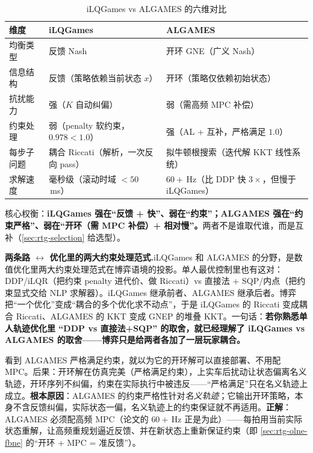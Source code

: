 \begin{table}[H]\centering\small
\caption{iLQGames vs ALGAMES 的六维对比}
\label{tab:rtg-ilq-vs-alg}
\begin{tabular}{p{} p{} p{}}
\toprule
维度 & iLQGames & ALGAMES \\
\midrule
均衡类型 & 反馈 Nash & 开环 GNE（广义 Nash） \\
信息结构 & 反馈（策略依赖当前状态 $x$） & 开环（策略仅依赖初始状态） \\
抗扰能力 & 强（$K$ 自动纠偏） & 弱（需高频 MPC 补偿） \\
约束处理 & 弱（penalty 软约束，$0.978<1.0$） & 强（AL + 互补，严格满足 $1.0$） \\
每步子问题 & 耦合 Riccati（解析，一次反向 pass） & 拟牛顿根搜索（迭代解 KKT 线性系统） \\
求解速度 & 毫秒级（滚动时域 $<50$\,ms） & $60+$\,Hz（比 DDP 快 $3\times$，但慢于 iLQGames） \\
\bottomrule
\end{tabular}
\end{table}

\noindent 核心权衡：\textbf{iLQGames 强在“反馈 + 快”、弱在“约束”；ALGAMES 强在“约束严格”、弱在“开环（需 MPC 补偿）+ 相对慢”。}两者不是谁取代谁，而是互补（\cref{sec:rtg-selection} 给选型）。

\begin{insight}
\textbf{两条路 $\leftrightarrow$ 优化里的两大约束处理范式.}\;iLQGames 和 ALGAMES 的分野，是数值优化里两大约束处理范式在博弈语境的投影。单人最优控制里也有这对：DDP/iLQR（把约束 penalty 进代价、做 Riccati）vs 直接法 + SQP/内点（把约束显式交给 NLP 求解器）。iLQGames 继承前者、ALGAMES 继承后者。博弈把“一个优化”变成“耦合的多个优化求不动点”，于是 iLQGames 的 Riccati 变成耦合 Riccati、ALGAMES 的 KKT 变成 GNEP 的堆叠 KKT。一句话：\textbf{若你熟悉单人轨迹优化里 “DDP vs 直接法+SQP” 的取舍，就已经理解了 iLQGames vs ALGAMES 的取舍——博弈只是给两者各加了一层玩家耦合。}
\end{insight}

\begin{pitfall}
看到 ALGAMES 严格满足约束，就以为它的开环解可以直接部署、不用配 MPC。后果：开环解在仿真完美（严格满足约束），上实车后扰动让状态偏离名义轨迹，开环序列不纠偏，约束在实际执行中被违反——“严格满足”只在名义轨迹上成立。\textbf{根本原因}：ALGAMES 的约束严格性针对\emph{名义轨迹}；它输出开环策略，本身不含反馈纠偏，实际状态一偏，名义轨迹上的约束保证就不再适用。\textbf{正解}：ALGAMES 必须配高频 MPC（论文的 $60+$\,Hz 正是为此）——每拍用当前实际状态重解，让高频重规划逼近反馈、并在新状态上重新保证约束（即 \cref{sec:rtg-olne-fbne} 的“开环 + MPC = 准反馈”）。
\end{pitfall}

